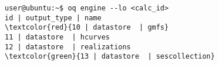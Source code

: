 \begin{Verbatim}[frame=single, commandchars=\\\{\}, fontsize=\small]
user@ubuntu:~$ oq engine --lo <calc_id>
id | output_type | name
\textcolor{red}{10 | datastore  | gmfs}
11 | datastore  | hcurves
12 | datastore  | realizations
\textcolor{green}{13 | datastore  | sescollection}
\end{Verbatim}